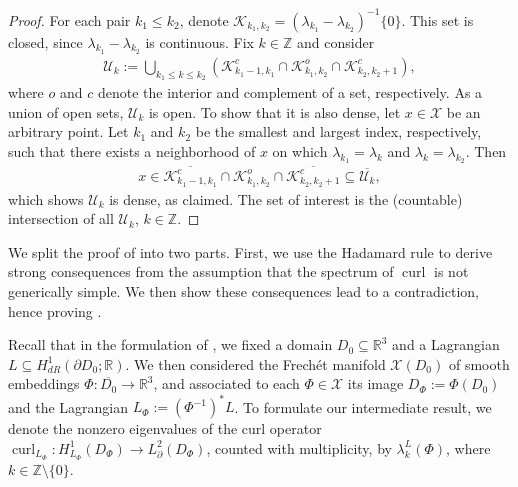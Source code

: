 \documentclass[11pt,reqno]{amsart}
\DeclareMathOperator{\curl}{curl}
\begin{document}
\begin{proof}
    For each pair $k_1 \leq k_2$, denote $\mathcal K_{k_1,k_2} = (\lambda_{k_1}-\lambda_{k_2})^{-1}\{0\}$. This set is closed, since $\lambda_{k_1}-\lambda_{k_2}$ is continuous. Fix $k \in \mathbb Z$ and consider
    \begin{align*}
        \mathcal U_k := \bigcup_{k_1 \leq k \leq k_2} \left( \mathcal K_{k_1-1,k_1}^c \cap \mathcal K_{k_1,k_2}^o \cap \mathcal K_{k_2,k_2+1}^c \right),
    \end{align*}
    where $o$ and $c$ denote the interior and complement of a set, respectively. As a union of open sets, $\mathcal{U}_k$ is open. To show that it is also dense, let $x \in \mathcal X$ be an arbitrary point. Let $k_1$ and $k_2$ be the smallest and largest index, respectively, such that there exists a neighborhood of $x$ on which $\lambda_{k_1} = \lambda_{k}$ and $\lambda_k = \lambda_{k_2}$. Then 
    \begin{align*}
        x \in \overline{\mathcal K_{k_1-1,k_1}^c} \cap \mathcal K_{k_1,k_2}^o \cap \overline{\mathcal K_{k_2,k_2+1}^c} \subseteq \overline{\mathcal U_k},
    \end{align*}
    which shows $\mathcal U_k$ is dense, as claimed. The set of interest is the (countable) intersection of all $\mathcal U_k$, $k \in \mathbb Z$.
\end{proof}

We split the proof of  into two parts. First, we use the Hadamard rule to derive strong consequences from the assumption that the spectrum of $\curl$ is not generically simple. We then show these consequences lead to a contradiction, hence proving . 

Recall that in the formulation of , we fixed a domain $D_0 \subseteq \mathbb R^3$ and a Lagrangian $L \subseteq H^1_{dR}(\partial D_0; \mathbb R)$. We then considered the Frech\'et manifold $\mathcal X(D_0)$ of smooth embeddings $\Phi: \overline{D_0} \to \mathbb R^3$, and associated to each $\Phi \in \mathcal X$ its image $D_\Phi := \Phi(D_0)$ and the Lagrangian $L_\Phi := (\Phi^{-1})^\ast L$. To formulate our intermediate result, we denote the nonzero eigenvalues of the curl operator $\curl_{L_{\Phi}}: H^1_{L_\Phi}(D_\Phi) \to L^2_\partial(D_\Phi)$, counted with multiplicity, by $\lambda^L_k(\Phi)$, where $k \in \mathbb Z\setminus\{0\}$.
\end{document}
